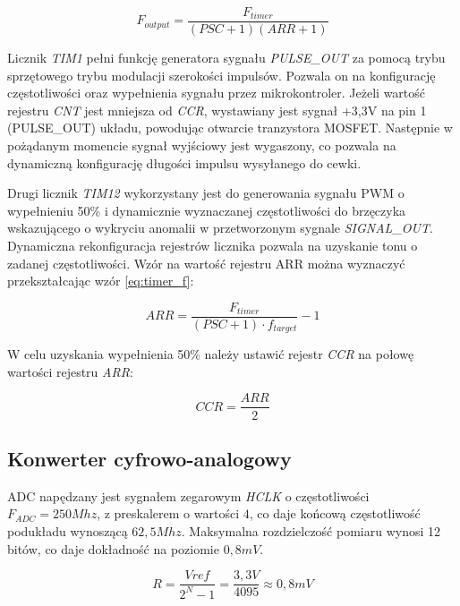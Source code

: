 \begin{equation}
    F_{output}=\frac{F_{timer}}{(PSC+1)(ARR+1)}
    \label{eq:timer_f}
\end{equation}


Licznik \textit{TIM1} pełni funkcję generatora sygnału \textit{PULSE\_OUT} za pomocą trybu sprzętowego trybu modulacji szerokości impulsów.
Pozwala on na konfigurację częstotliwości oraz wypełnienia sygnału przez mikrokontroler. Jeżeli wartość rejestru \textit{CNT} jest mniejsza od \textit{CCR}, wystawiany jest sygnał +3,3V na pin 1 (PULSE\_OUT) układu, powodując otwarcie tranzystora MOSFET. Następnie w pożądanym momencie sygnał wyjściowy jest wygaszony, co pozwala na dynamiczną konfigurację długości impulsu wysyłanego do cewki.

Drugi licznik \textit{TIM12} wykorzystany jest do generowania sygnału PWM o wypełnieniu 50\% i dynamicznie wyznaczanej częstotliwości do brzęczyka wskazującego o wykryciu anomalii w przetworzonym sygnale \textit{SIGNAL\_OUT}.
Dynamiczna rekonfiguracja rejestrów licznika pozwala na uzyskanie tonu o zadanej częstotliwości. 
Wzór na wartość rejestru ARR można wyznaczyć przekształcając wzór \ref{eq:timer_f}:

\begin{equation}
    ARR = \frac{F_{timer}}{(PSC+1) \cdot f_{target}} - 1
    \label{eq:buzzer_arr}
\end{equation}

W celu uzyskania wypełnienia 50\% należy ustawić rejestr \textit{CCR} na połowę wartości rejestru \textit{ARR}:

\begin{equation}
    CCR = \frac{ARR}{2}
    \label{eq:buzzer_ccr}
\end{equation}

\subsection{Konwerter cyfrowo-analogowy}

ADC napędzany jest sygnałem zegarowym \textit{HCLK} o częstotliwości $F_{ADC}=250Mhz$, z preskalerem o wartości $4$, co daje końcową częstotliwość podukładu wynoszącą $62,5Mhz$.
Maksymalna rozdzielczość pomiaru wynosi 12 bitów, co daje dokładność na poziomie $0,8 mV$.

\begin{equation}
R= \frac{Vref}{2^N - 1} =\frac{3,3V}{4095}\approx 0,8mV
\end{equation}

